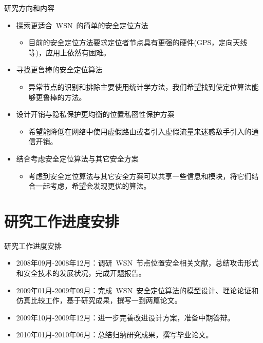 \documentclass[mathserif,compress,CJKutf8, red]{beamer}
\begin{document}
\begin{CJK*}{UTF8}{song}
\begin{frame}{研究方向和内容}
\begin{itemize}
\item 探索更适合~WSN~的简单的安全定位方法
\begin{itemize}
\item 目前的安全定位方法要求定位者节点具有更强的硬件(GPS，定向天线等)，应用上依然有困难。
\end{itemize}
\item 寻找更鲁棒的安全定位算法
\begin{itemize}
\item 异常节点的识别和排除主要使用统计学方法，我们希望找到使定位算法能够更鲁棒的方法。
\end{itemize}
\item 设计开销与隐私保护更均衡的位置私密性保护方案
\begin{itemize}
\item 希望能降低在网络中使用虚假路由或者引入虚假流量来迷惑敌手引入的通信开销。
\end{itemize}
\item 结合考虑安全定位算法与其它安全方案
\begin{itemize}
\item 考虑到安全定位算法与其它安全方案可以共享一些信息和模块，将它们结合一起考虑，希望会发现更优的算法。
\end{itemize}
\end{itemize}

\end{frame}

\section{研究工作进度安排}

\begin{frame}{研究工作进度安排}
\begin{itemize}
\item 2008年09月-2008年12月：调研~WSN~节点位置安全相关文献，总结攻击形式和安全技术的发展状况，完成开题报告。
\item 2009年01月-2009年09月：完成~WSN~安全定位算法的模型设计、理论论证和仿真比较工作，基于研究成果，撰写一到两篇论文。
\item 2009年10月-2009年12月：进一步完善改进设计方案，准备中期答辩。
\item 2010年01月-2010年06月：总结归纳研究成果，撰写毕业论文。
\end{itemize}

\end{frame}


\end{CJK*}
\end{document}

